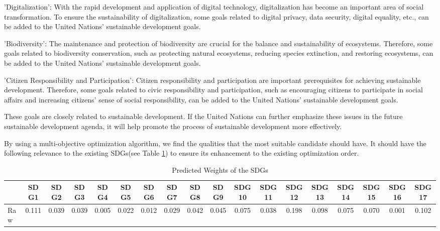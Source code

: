 \documentclass[10pt]{mcmthesis}
\begin{document}
'Digitalization': With the rapid development and application of digital technology, digitalization has become an important area of social transformation. To ensure the sustainability of digitalization, some goals related to digital privacy, data security, digital equality, etc., can be added to the United Nations' sustainable development goals.

'Biodiversity': The maintenance and protection of biodiversity are crucial for the balance and sustainability of ecosystems. Therefore, some goals related to biodiversity conservation, such as protecting natural ecosystems, reducing species extinction, and restoring ecosystems, can be added to the United Nations' sustainable development goals.

'Citizen Responsibility and Participation': Citizen responsibility and participation are important prerequisites for achieving sustainable development. Therefore, some goals related to civic responsibility and participation, such as encouraging citizens to participate in social affairs and increasing citizens' sense of social responsibility, can be added to the United Nations' sustainable development goals.

These goals are closely related to sustainable development. If the United Nations can further emphasize these issues in the future sustainable development agenda, it will help promote the process of sustainable development more effectively.

By using a multi-objective optimization algorithm, we find the qualities that the most suitable candidate should have. It should have the following relevance to the existing SDGs(see Table \ref{tab. pre weights of SDG}) to ensure its enhancement to the existing optimization order. 

\begin{table}[h]\caption{ Predicted Weights of the SDGs }
\centering
\label{tab. pre weights of SDG}
\tiny
\tabcolsep=0.1cm
\begin{tabular}{lccccccccccccccccc}
\hline
\multicolumn{1}{c}{} & SDG1  & SDG2  & SDG3  & SDG4  & SDG5  & SDG6  & SDG7  & SDG8  & SDG9  & SDG10 & SDG11 & SDG12 & SDG13 & SDG14 & SDG15 & SDG16 & SDG17 \\ \hline
Raw                  & 0.111 & 0.039 & 0.039 & 0.005 & 0.022 & 0.012 & 0.029 & 0.042 & 0.045 & 0.075 & 0.038 & 0.198 & 0.098 & 0.075 & 0.070 & 0.001 & 0.102 
\\ \hline
\end{tabular}
\end{table}
\end{document}
